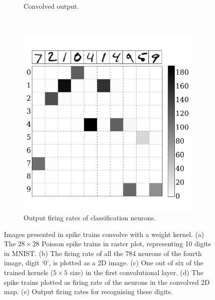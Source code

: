 \begin{figure}[htbp!]
\begin{subfigure}[t]{0.3\textwidth}
			\caption{Convolved output.}
			\label{Fig:64}
		\end{subfigure}\\
		\begin{subfigure}[t]{0.5\textwidth}
			\includegraphics[width=\textwidth]{pics_iconip/7.pdf}
			\caption{Output firing rates of classification neurons.}
		\end{subfigure}
		\caption{Images presented in spike trains convolve with a weight kernel. (a) The $28\times28$ Poisson spike trains in raster plot, representing 10 digits in MNIST. (b) The firing rate of all the 784 neurons of the fourth image, digit `0', is plotted as a 2D image.
		(c) One out of six of the trained kernels ($5\times5$ size) in the first convolutional layer.
		(d) The spike trains plotted as firing rate of the neurons in the convolved 2D map.
		(e) Output firing rates for recognising these digits.}
		\label{fig:cnn}
	\end{figure}

